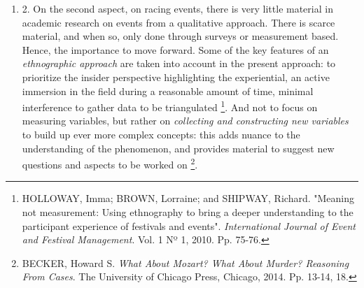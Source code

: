 \begin{enumerate}
 \item 2. On the second aspect, on racing events, there is very little material in academic research on events from a qualitative approach. There is scarce material, and when so, only done through surveys or measurement based. Hence, the importance to move forward. Some of the key features of an \textit{ethnographic approach} are taken into account in the present approach: to prioritize the insider perspective highlighting the experiential, an active immersion in the field during a reasonable amount of time, minimal interference to gather data to be triangulated%
 \footnote{HOLLOWAY, Imma; BROWN, Lorraine; and SHIPWAY, Richard. "Meaning not measurement: Using ethnography to bring a deeper understanding to the participant experience of festivals and events". \textit{International Journal of Event and Festival Management}. Vol. 1 Nº 1, 2010. Pp. 75-76.}.
 And not to focus on measuring variables, but rather on \textit{collecting and constructing new variables} to build up ever more complex concepts: this adds nuance to the understanding of the phenomenon, and provides material to suggest new questions and aspects to be worked on%
 \footnote{BECKER, Howard S. \textit{What About Mozart? What About Murder? Reasoning From Cases}. The University of Chicago Press, Chicago, 2014. Pp. 13-14, 18.}.

\end{enumerate}


